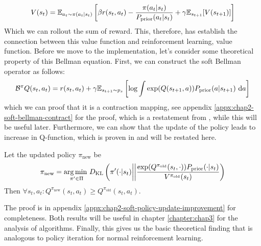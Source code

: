 \begin{equation}
    V(s_t) = \mathbb{E}_{a_t \sim \pi(a_t | s_t)} \left[\beta r(s_t, a_t) - \frac{\pi(a_t | s_t)}{P_{\text{prior}}(a_t | s_t)} + \gamma\mathbb{E}_{s_{t+1}}[V(s_{t+1})]\right]
\end{equation}
Which we can rollout the sum of reward. This, therefore, has establish the connection between this value function and reinforcement learning, value function. Before we move to the implementation, let's consider some theoretical property of this Bellman equation. First, we can construct the soft Bellman operator as follows: 
\begin{equation}
    \mathcal{B}^{\pi} Q(s_t, a_t) = r(s_t, a_t) + \gamma \mathbb{E}_{s_{t+1} \sim p_{s}}\left[ \log \int \exp(Q(s_{t+1}, a)) P_{\text{prior}}(a | s_{t+1}) \ \mathrm{d} a \right]
\end{equation}
which we can proof that it is a contraction mapping, see appendix \ref{appx:chap2-soft-bellman-contract} for the proof, which is a restatement from \cite{haarnoja2017reinforcement}, while this will be useful later. Furthermore, we can show that the update of the policy leads to increase in Q-function, which is proven in \cite{haarnoja2018softa} and will be restated here. 
\begin{theorem}
    Let the updated policy $\pi_{\text{new}}$ be 
    \begin{equation}
        \pi_{\text{new}} = \underset{\pi' \in \Pi}{\arg\min \ } D_{\mathrm{KL}}\left( \pi'(\cdot | s_t) \bigg|\bigg| \frac{\exp(Q^{\pi_{\text{old}}}(s_t, \cdot)) P_{\text{prior}}(\cdot | s_t)}{V^{\pi_{\text{old}}}(s_t)} \right)
    \end{equation}
    Then $\forall s_t, a_t : Q^{\pi_{\text{new}}}(s_t, a_t) \ge Q^{\pi_{\text{old}}}(s_t, a_t) $.
\end{theorem}
The proof is in appendix \ref{appx:chap2-soft-policy-update-improvement} for completeness. Both results will be useful in chapter \ref{chapter:chap3} for the analysis of algorithms. Finally, this gives us the basic theoretical finding that is analogous to policy iteration for normal reinforcement learning.

